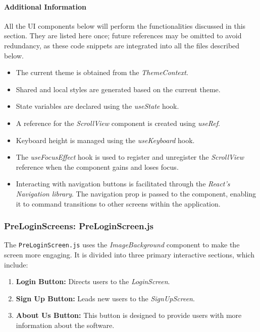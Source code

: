 \paragraph{Additional Information}

All the UI components below will perform the functionalities discussed in this section. They are listed here once; future references may be omitted to avoid redundancy, as these code snippets are integrated into all the files described below.

\begin{itemize}
    \item The current theme is obtained from the \textit{ThemeContext}.
    \item Shared and local styles are generated based on the current theme.
    \item State variables are declared using the \textit{useState} hook.
    \item A reference for the \textit{ScrollView} component is created using \textit{useRef}.
    \item Keyboard height is managed using the \textit{useKeyboard} hook.
    \item The \textit{useFocusEffect} hook is used to register and unregister the \textit{ScrollView} reference when the component gains and loses focus.
    \item Interacting with navigation buttons is facilitated through the \textit{React's Navigation library}. The navigation prop is passed to the component, enabling it to command transitions to other screens within the application.
\end{itemize}

\subsubsection{PreLoginScreens: PreLoginScreen.js}

The \texttt{PreLoginScreen.js} uses the \textit{ImageBackground} component to make the screen more engaging.  It is divided into three primary interactive sections, which include:

\begin{enumerate}
    \item \textbf{Login Button:} Directs users to the \textit{LoginScreen}.
    \item \textbf{Sign Up Button:} Leads new users to the \textit{SignUpScreen}.
    \item \textbf{About Us Button:} This button is designed to provide users with more information about the software. 
\end{enumerate}


